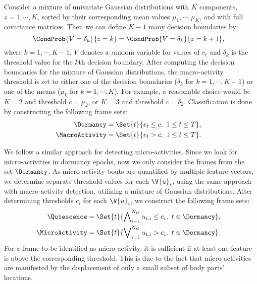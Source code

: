 Consider a mixture of univariate Gaussian distributions with $K$ components, $z=1, \cdots, K$, sorted by their corresponding mean values $\mu_1, \cdots, \mu_K$, and with full covariance matrices. Then we can define $K-1$ many decision boundaries by:
\begin{equation}
	\CondProb{V=\delta_k}{z=k} = \CondProb{V=\delta_k}{z=k+1},
\end{equation}
where $k=1, \cdots, K-1$, $V$ denotes a random variable for values of $v_t$ and $\delta_k$ is the threshold value for the $k$th decision boundary.
After computing the decision boundaries for the mixture of Gaussian distributions, the macro-activity threshold is set to either one of the decision boundaries ($\delta_k$ for $k=1, \cdots, K-1$) or one of the means ($\mu_k$ for $k=1, \cdots, K$).
For example, a reasonable choice would be $K=2$ and threshold $c=\mu_2$, or $K=3$ and threshold $c=\delta_2$.
Classification is done by constructing the following frame sets:
\begin{equation}
	\begin{aligned}
		\Dormancy      & =\Set{t}{v_t \leq c, \ 1\leq t \leq T}, \\
		\MacroActivity & =\Set{t}{v_t>c, \ 1\leq t \leq T}.
	\end{aligned}
\end{equation}

We follow a similar approach for detecting micro-activities.
Since we look for micro-activities in dormancy epochs, now we only consider the frames from the set $\Dormancy$.
As micro-activity bouts are quantified by multiple feature vectors, we determine separate threshold values for each $\V{u}_i$, using the same approach with macro-activity detection, utilizing a mixture of Gaussian distributions.
After determining thresholds $c_i$ for each $\V{u}_i$, we construct the following frame sets:
\begin{equation}
	\begin{aligned}
		\Quiescence    & = \Set{t}{\bigwedge\nolimits_{i=1}^{N_G} u_{t,i} \leq c_i, \ t \in \Dormancy}, \\
		\MicroActivity & = \Set{t}{\bigvee\nolimits_{i=1}^{N_G} u_{t,i} > c_i, \ t \in \Dormancy}.
	\end{aligned}
\end{equation}
For a frame to be identified as micro-activity, it is sufficient if at least one feature is above the corresponding threshold.
This is due to the fact that micro-activities are manifested by the displacement of only a small subset of body parts' locations.

